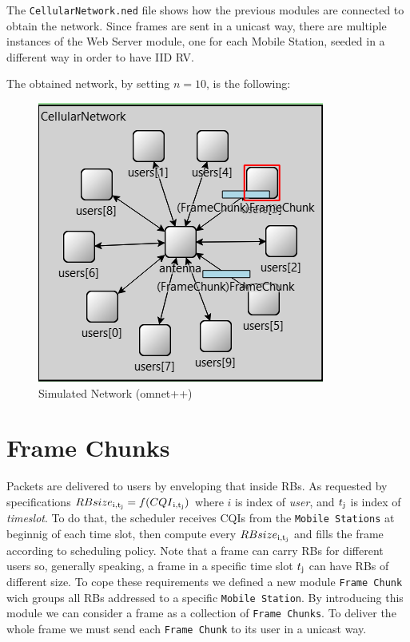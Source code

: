 The \texttt{CellularNetwork.ned} file shows how the previous modules are connected to obtain the network. Since frames are sent in a unicast way, there are multiple instances of the Web Server module, one for each Mobile Station, seeded in a different way in order to have IID RV.

The obtained network, by setting \(n=10\), is the following: 
\begin{figure}[H]
  \centering
  \includegraphics{images/network_simulations}
  \caption{Simulated Network (omnet++)}
  \label{fig:simulated_network}
\end{figure}

\section{Frame Chunks}
  Packets are delivered to users by enveloping that inside RBs. As requested by specifications \(RBsize\textsubscript{i,t\textsubscript{j}}=f(CQI\textsubscript{i,t\textsubscript{j}})\) where \(i\) is index of \textit{user}, and \(t\textsubscript{j}\) is index of \textit{timeslot}.
  To do that, the scheduler receives CQIs from the \texttt{Mobile Stations} at beginnig of each time slot, then compute every \(RBsize\textsubscript{i,t\textsubscript{j}}\) and fills the frame according to scheduling policy. Note that a frame can carry RBs for different users so, generally speaking, a frame in a specific time slot \(t\textsubscript{j}\) can have RBs of different size. To cope these requirements we defined a new module \texttt{Frame Chunk} wich groups all RBs addressed to a specific \texttt{Mobile Station}. By introducing this module we can consider a frame as a collection of \texttt{Frame Chunks}. To deliver the whole frame we must send each \texttt{Frame Chunk} to its user in a unicast way.

